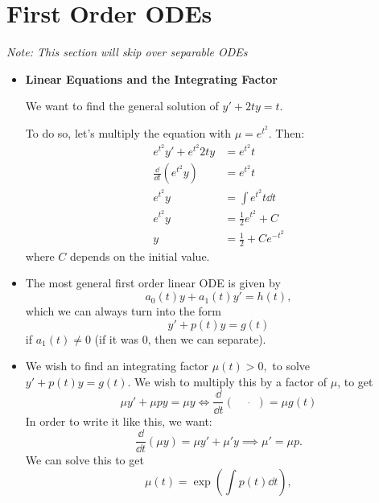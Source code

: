 \section{First Order ODEs}
\textit{Note: This section will skip over separable ODEs} 
\begin{itemize}
    \item \textbf{Linear Equations and the Integrating Factor} 
    \begin{example}
        We want to find the general solution of $y' + 2ty = t$.
        \vspace{2mm}

        To do so, let's multiply the equation with $\mu = e^{t^2}$. Then: 
        \begin{align}
            e^{t^2}y' + e^{t^2}2ty &= e^{t^2}t \\ 
            \frac{\dd}{\dd{t}} (e^{t^2}y) &= e^{t^2}t \\ 
            e^{t^2}y &= \int e^{t^2}t \dd{t} \\
            e^{t^2}y &= \frac{1}{2}e^{t^2} + C \\ 
            y &= \frac{1}{2} + C e^{-t^2}
        \end{align}
        where $C$ depends on the initial value.
    \end{example}
    \item The most general first order linear ODE is given by 
    \begin{equation}
        a_0(t)y + a_1(t)y' = h(t),
    \end{equation}
    which we can always turn into the form 
    \begin{equation}
        y' + p(t)y = g(t)
    \end{equation}
    if $a_1(t) \neq 0$ (if it was $0$, then we can separate).
    \item We wish to find an integrating factor $\mu(t) > 0,$ to solve $y'+p(t)y=g(t).$ We wish to multiply this by a factor of $\mu$, to get 
    \begin{equation}
        \mu y' + \mu p y = \mu y \iff \frac{\dd}{\dd{t}}\left(\quad\dot\quad\right) = \mu g(t)
    \end{equation}
    In order to write it like this, we want: 
    \begin{equation}
        \frac{\dd}{\dd t}(\mu y) = \mu y' + \mu' y \implies \mu' = \mu p.
    \end{equation}
    We can solve this to get 
    \begin{equation}
        \mu(t) = \exp\left(\int p(t) \dd{t}\right),

\end{equation}
\end{itemize}
